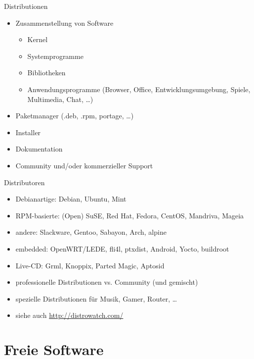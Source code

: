 \documentclass{beamer}
\begin{document}
\begin{frame}{Distributionen}
    \begin{itemize}
        \item Zusammenstellung von Software
            \begin{itemize}
                \item Kernel
                \item Systemprogramme
                \item Bibliotheken
                \item Anwendungsprogramme (Browser, Office,
                    Entwicklungsumgebung, Spiele, Multimedia, Chat, …)
            \end{itemize}
        \pause
        \item Paketmanager (.deb, .rpm, portage, …)
        \pause
        \item Installer
        \item Dokumentation
        \item Community und/oder kommerzieller Support
    \end{itemize}
\end{frame}

\begin{frame}{Distributoren}
    \begin{itemize}
        \item Debianartige: Debian, Ubuntu, Mint
        \pause
        \item RPM-basierte: (Open) SuSE, Red Hat, Fedora, CentOS,
            Mandriva, Mageia
        \pause
        \item andere: Slackware, Gentoo, Sabayon, Arch, alpine
        \pause
        \item embedded: OpenWRT/LEDE, fli4l, ptxdist, Android, Yocto,
            buildroot
        \pause
        \item Live-CD: Grml, Knoppix, Parted Magic, Aptosid
        \pause
        \item professionelle Distributionen vs. Community (und gemischt)
        \item spezielle Distributionen für Musik, Gamer, Router, …
        \item siehe auch \url{http://distrowatch.com/}
    \end{itemize}
\end{frame}

\section{Freie Software}
\end{document}
